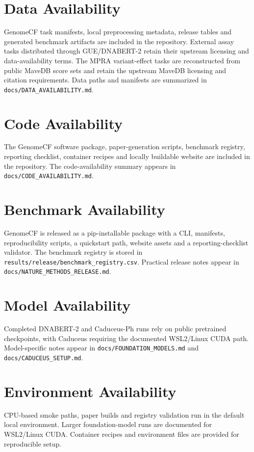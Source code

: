 \documentclass[11pt]{article}
\begin{document}
\section{Data Availability}
GenomeCF task manifests, local preprocessing metadata, release tables and generated benchmark artifacts are included in the repository. External assay tasks distributed through GUE/DNABERT-2 retain their upstream licensing and data-availability terms. The MPRA variant-effect tasks are reconstructed from public MaveDB score sets and retain the upstream MaveDB licensing and citation requirements. Data paths and manifests are summarized in \texttt{docs/DATA\_AVAILABILITY.md}.

\section{Code Availability}
The GenomeCF software package, paper-generation scripts, benchmark registry, reporting checklist, container recipes and locally buildable website are included in the repository. The code-availability summary appears in \texttt{docs/CODE\_AVAILABILITY.md}.

\section{Benchmark Availability}
GenomeCF is released as a pip-installable package with a CLI, manifests, reproducibility scripts, a quickstart path, website assets and a reporting-checklist validator. The benchmark registry is stored in \texttt{results/release/benchmark\_registry.csv}. Practical release notes appear in \texttt{docs/NATURE\_METHODS\_RELEASE.md}.

\section{Model Availability}
Completed DNABERT-2 and Caduceus-Ph runs rely on public pretrained checkpoints, with Caduceus requiring the documented WSL2/Linux CUDA path. Model-specific notes appear in \texttt{docs/FOUNDATION\_MODELS.md} and \texttt{docs/CADUCEUS\_SETUP.md}.

\section{Environment Availability}
CPU-based smoke paths, paper builds and registry validation run in the default local environment. Larger foundation-model runs are documented for WSL2/Linux CUDA. Container recipes and environment files are provided for reproducible setup.
\end{document}
